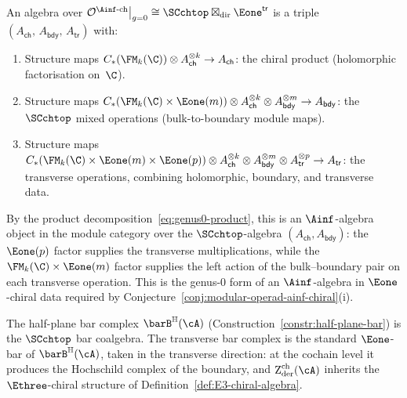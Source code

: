 \begin{remark}
\label{rem:algebras-genus0-ainf-chiral}
An algebra over
$\mathcal{O}^{\Ainf\text{-ch}}\big|_{g=0}
\cong \SCchtop\boxtimes_{\mathrm{dir}}\Eone^{\mathsf{tr}}$
is a triple
$(A_{\mathsf{ch}},\, A_{\mathsf{bdy}},\, A_{\mathsf{tr}})$
with:
\begin{enumerate}[label=\textup{(\alph*)}]
\item Structure maps
 $C_\ast(\FM_k(\C)) \otimes A_{\mathsf{ch}}^{\otimes k}
 \to A_{\mathsf{ch}}$:
 the chiral product (holomorphic factorisation on~$\C$).
\item Structure maps
 $C_\ast(\FM_k(\C) \times \Eone(m)) \otimes
 A_{\mathsf{ch}}^{\otimes k} \otimes
 A_{\mathsf{bdy}}^{\otimes m} \to A_{\mathsf{bdy}}$:
 the $\SCchtop$ mixed operations (bulk-to-boundary module maps).
\item Structure maps
 $C_\ast(\FM_k(\C) \times \Eone(m) \times \Eone(p))
 \otimes A_{\mathsf{ch}}^{\otimes k} \otimes
 A_{\mathsf{bdy}}^{\otimes m} \otimes
 A_{\mathsf{tr}}^{\otimes p} \to A_{\mathsf{tr}}$:
 the transverse operations, combining holomorphic, boundary,
 and transverse data.
\end{enumerate}
By the product decomposition~\eqref{eq:genus0-product},
this is an $\Ainf$-algebra object in the module category over the
$\SCchtop$-algebra $(A_{\mathsf{ch}},A_{\mathsf{bdy}})$: the
$\Eone(p)$ factor supplies the transverse multiplications, while the
$\FM_k(\C)\times\Eone(m)$ factor supplies the left action of the
bulk--boundary pair on each transverse operation. This is the
genus-$0$ form of an $\Ainf$-algebra in $\Eone$-chiral data required by
Conjecture~\ref{conj:modular-operad-ainf-chiral}(i).

The half-plane bar complex
$\barB^{\mathbb{H}}(\cA)$
(Construction~\ref{constr:half-plane-bar}) is the
$\SCchtop$ bar coalgebra. The transverse bar complex is
the standard $\Eone$-bar of $\barB^{\mathbb{H}}(\cA)$,
taken in the transverse direction: at the cochain level
it produces the Hochschild complex of the boundary, and
$\Zder^{\mathrm{ch}}(\cA)$ inherits the $\Ethree$-chiral
structure of Definition~\ref{def:E3-chiral-algebra}.
\end{remark}

